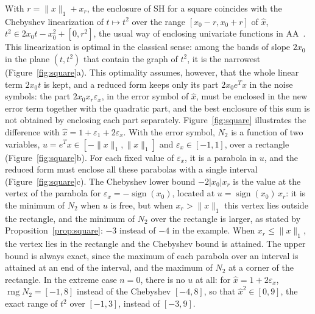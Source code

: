 \documentclass[10pt]{article}
\theoremstyle{definition}
\newcommand{\eps}{\varepsilon}
\newcommand{\ex}{\eps_x}
\newcommand{\rng}{\operatorname{rng}}
\begin{document}
With $r=\|x\|_1+x_r$, the enclosure of SH for a square coincides with the Chebyshev linearization of $t\mapsto t^2$ over the range $[x_0-r,x_0+r]$ of $\hat x$, $t^2\in 2x_0t-x_0^2+[0,r^2]$, the usual way of enclosing univariate functions in AA~\cite{stolfi1997self}. This linearization is optimal in the classical sense: among the bands of slope $2x_0$ in the plane $(t,t^2)$ that contain the graph of $t^2$, it is the narrowest (Figure~\ref{fig:square}a). This optimality assumes, however, that the whole linear term $2x_0t$ is kept, and a reduced form keeps only its part $2x_0e^Tx$ in the noise symbols: the part $2x_0x_r\ex$, in the error symbol of $\hat x$, must be enclosed in the new error term together with the quadratic part, and the best enclosure of this sum is not obtained by enclosing each part separately. Figure~\ref{fig:square} illustrates the difference with $\hat x=1+\eps_1+2\ex$. With the error symbol, $N_2$ is a function of two variables, $u=e^Tx\in[-\|x\|_1,\|x\|_1]$ and $\ex\in[-1,1]$, over a rectangle (Figure~\ref{fig:square}b). For each fixed value of $\ex$, it is a parabola in $u$, and the reduced form must enclose all these parabolas with a single interval (Figure~\ref{fig:square}c). The Chebyshev lower bound $-2|x_0|x_r$ is the value at the vertex of the parabola for $\ex=-\operatorname{sign}(x_0)$, located at $u=\operatorname{sign}(x_0)\,x_r$: it is the minimum of $N_2$ when $u$ is free, but when $x_r>\|x\|_1$ this vertex lies outside the rectangle, and the minimum of $N_2$ over the rectangle is larger, as stated by Proposition~\ref{prop:square}: $-3$ instead of $-4$ in the example. When $x_r\le\|x\|_1$, the vertex lies in the rectangle and the Chebyshev bound is attained. The upper bound is always exact, since the maximum of each parabola over an interval is attained at an end of the interval, and the maximum of $N_2$ at a corner of the rectangle. In the extreme case $n=0$, there is no $u$ at all: for $\hat x=1+2\ex$, $\rng N_2=[-1,8]$ instead of the Chebyshev $[-4,8]$, so that $\hat x^2\in[0,9]$, the exact range of $t^2$ over $[-1,3]$, instead of $[-3,9]$.
\end{document}
